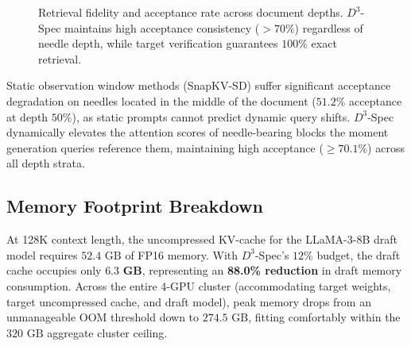 \documentclass[runningheads]{llncs}
\begin{document}
\begin{figure}[t]
\centering
{}
\caption{Retrieval fidelity and acceptance rate across document depths. $D^3$-Spec maintains high acceptance consistency ($>70\%$) regardless of needle depth, while target verification guarantees $100\%$ exact retrieval.}
\label{fig:niah_depth}
\end{figure}

Static observation window methods (SnapKV-SD) suffer significant acceptance degradation on needles located in the middle of the document ($51.2\%$ acceptance at depth $50\%$), as static prompts cannot predict dynamic query shifts. $D^3$-Spec dynamically elevates the attention scores of needle-bearing blocks the moment generation queries reference them, maintaining high acceptance ($\ge 70.1\%$) across all depth strata.

\subsection{Memory Footprint Breakdown}
At 128K context length, the uncompressed KV-cache for the LLaMA-3-8B draft model requires $52.4\text{ GB}$ of FP16 memory. With $D^3$-Spec's $12\%$ budget, the draft cache occupies only $\mathbf{6.3\text{ GB}}$, representing an \textbf{88.0\% reduction} in draft memory consumption. Across the entire 4-GPU cluster (accommodating target weights, target uncompressed cache, and draft model), peak memory drops from an unmanageable OOM threshold down to $274.5\text{ GB}$, fitting comfortably within the $320\text{ GB}$ aggregate cluster ceiling.
\end{document}
